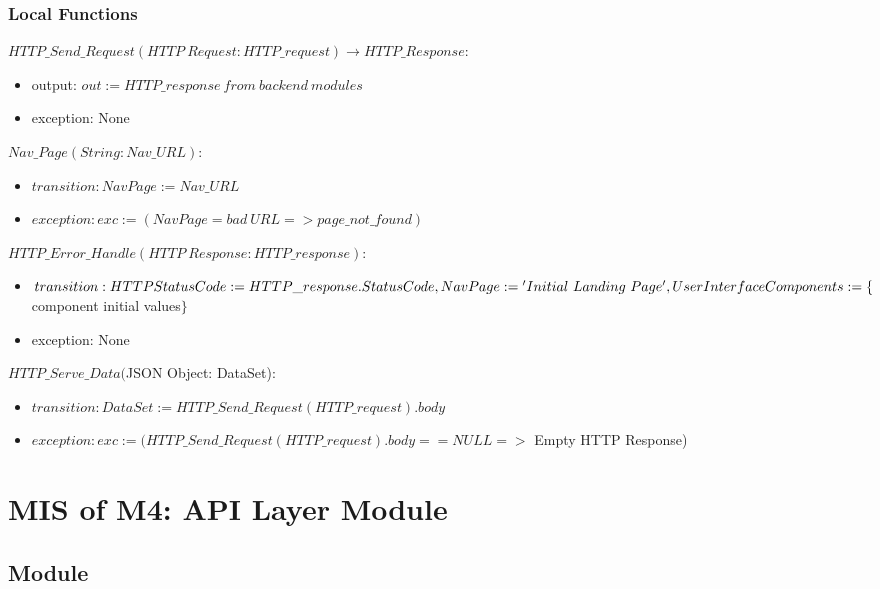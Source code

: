 \documentclass[12pt, titlepage]{article}
\begin{document}
\subsubsection{Local Functions}

\par{$HTTP\_Send\_Request(HTTP~Request: HTTP\_request) \rightarrow HTTP\_Response$: }
\begin{itemize}
  \item{output: $out := HTTP\_response~from~backend~modules$}
  \item{exception: None}
\end{itemize}

\par{$Nav\_Page(String: Nav\_URL):$ }
\begin{itemize}
  \item{$transition: NavPage := Nav\_URL$}
  \item{$exception: exc := (NavPage = bad~URL => page\_not\_found)$}
\end{itemize}

\par{$HTTP\_Error\_Handle(HTTP~Response: HTTP\_response):$ }
\begin{itemize}
  \item{$transition: HTTPStatusCode := HTTP\_response.StatusCode, NavPage := \\'Initial~Landing~Page', UserInterfaceComponents := \{$component initial values$\}$ }
  \item{exception: None}
\end{itemize}

\par{$HTTP\_Serve\_Data($JSON Object: DataSet): }
\begin{itemize}
  \item{$transition: DataSet := HTTP\_Send\_Request(HTTP\_request).body$}
  \item{$exception: exc := (HTTP\_Send\_Request(HTTP\_request).body == NULL =>$ Empty HTTP Response)}

\end{itemize}

\section{MIS of M4: API Layer Module} \label{Module 4}

\subsection{Module}
\end{document}
